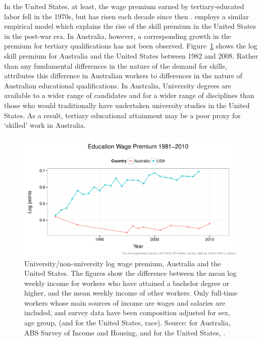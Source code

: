In the United States, at least, the wage premium earned by tertiary-educated labor fell in the 1970s, but has risen each decade since then \citep{Acemoglu2011}. \citet{Katz1992} employs a similar empirical model which explains the rise of the skill premium in the United States in the post-war era. In Australia, however, a corresponding growth in the premium for tertiary qualifications has not been observed. Figure~\ref{fig:wagepremium} shows the log skill premium for Australia and the United States between 1982 and 2008. Rather than any fundamental differences in the nature of the demand for skills, \citet{Coelli2009} attributes this difference in Australian workers to differences in the nature of Australian educational qualifications. In Australia, University degrees are available to a wider range of candidates and for a wider range of disciplines than those who would traditionally have undertaken university studies in the United States. As a result, tertiary educational attainment may be a poor proxy for `skilled' work in Australia.
\begin{figure}
  \centering
  \includegraphics[width=\textwidth]{../figure/ed_premium_time_two.pdf}
  \caption{University/non-university log wage premium, Australia and the United States. The figures show the difference between the mean log weekly income for workers who have attained a bachelor degree or higher, and the mean weekly income of other workers. Only full-time workers whose main sources of income are wages and salaries are included, and survey data have been composition adjusted for sex, age group, (and for the United States, race). Source: for Australia, ABS Survey of Income and Housing, and for the United States, \citet{Acemoglu2011}.}
  \label{fig:wagepremium}
\end{figure}

